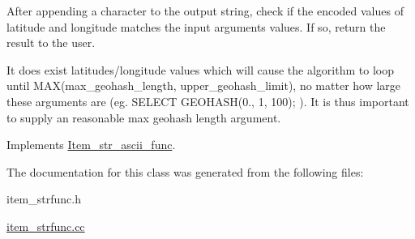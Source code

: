 After appending a character to the output string, check if the encoded values of latitude and longitude matches the input arguments values. If so, return the result to the user.

It does exist latitudes/longitude values which will cause the algorithm to loop until M\+A\+X(max\+\_\+geohash\+\_\+length, upper\+\_\+geohash\+\_\+limit), no matter how large these arguments are (eg. S\+E\+L\+E\+CT G\+E\+O\+H\+A\+SH(0., 1, 100); ). It is thus important to supply an reasonable max geohash length argument. 

Implements \mbox{\hyperlink{classItem__str__ascii__func}{Item\+\_\+str\+\_\+ascii\+\_\+func}}.



The documentation for this class was generated from the following files\+:\begin{DoxyCompactItemize}
\item 
item\+\_\+strfunc.\+h\item 
\mbox{\hyperlink{item__strfunc_8cc}{item\+\_\+strfunc.\+cc}}\end{DoxyCompactItemize}
